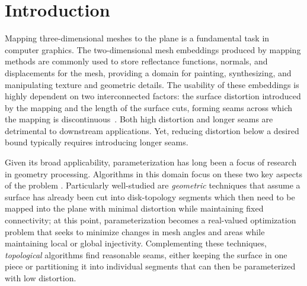 
\section{Introduction}
Mapping three-dimensional meshes to the plane is a fundamental task in computer graphics.  The two-dimensional mesh embeddings produced by mapping methods are commonly used to store reflectance functions, normals, and displacements
for the mesh, providing a domain for painting, synthesizing, and manipulating texture and geometric details. 
%
The usability of these embeddings is highly dependent on two interconnected factors: the surface distortion introduced by the mapping and the length of the surface cuts, forming seams across which the mapping is discontinuous~\cite{Hormann2008}. Both high distortion and longer seams are detrimental to downstream applications. Yet, reducing distortion below a desired 
bound typically requires introducing longer seams. 

Given its broad applicability, parameterization has long been a focus of research in geometry processing. Algorithms in this domain focus on these two key aspects of the problem \cite{Sheffer07_ParameterizationSurvey}.  Particularly well-studied are \emph{geometric} techniques that assume a surface has already been cut into disk-topology segments which then need to be mapped into the plane with minimal distortion while maintaining fixed connectivity; at this point, parameterization becomes a real-valued optimization problem that seeks to minimize changes in mesh angles and areas while maintaining local or global injectivity. Complementing these techniques, \emph{topological} algorithms find reasonable seams, either keeping the surface in one piece or partitioning it into individual segments that can then be parameterized with low distortion. %

